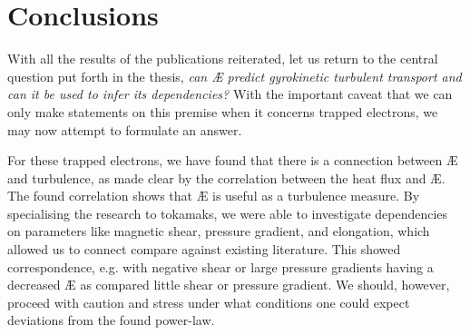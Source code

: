 \section{Conclusions}
With all the results of the publications reiterated, let us return to the central question put forth in the thesis, {\it can \AE{} predict gyrokinetic turbulent transport and can it be used to infer its dependencies?} With the important caveat that we can only make statements on this premise when it concerns trapped electrons, we may now attempt to formulate an answer. \par 
For these trapped electrons, we have found that there is a connection between \AE{} and turbulence, as made clear by the correlation between the heat flux and \AE{}. The found correlation shows that \AE{} is useful as a turbulence measure. By specialising the research to tokamaks, we were able to investigate dependencies on parameters like magnetic shear, pressure gradient, and elongation, which allowed us to connect compare against existing literature. This showed correspondence, e.g. with negative shear or large pressure gradients having a decreased \AE{} as compared little shear or pressure gradient. We should, however, proceed with caution and stress under what conditions one could expect deviations from the found power-law. 

